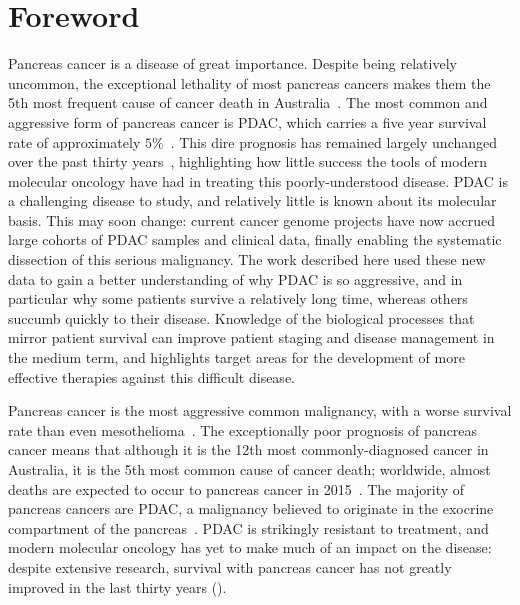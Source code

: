 \documentclass[thesis.tex]{subfiles}
\begin{document}
\chapter[Foreword]{Foreword}
\label{chap:intro}

Pancreas cancer is a disease of great importance.  Despite being relatively uncommon, the exceptional lethality of most pancreas cancers makes them the 5th most frequent cause of cancer death in Australia~\cite{CAN88}.  The most common and aggressive form of pancreas cancer is \gls{PDAC}, which carries a five year survival rate of approximately $5\%$~\cite{CAN65}.  This dire prognosis has remained largely unchanged over the past thirty years~\cite{CAN65, SEER2014}, highlighting how little success the tools of modern molecular oncology have had in treating this poorly-understood disease.  \gls{PDAC} is a challenging disease to study, and relatively little is known about its molecular basis.  This may soon change: current cancer genome projects have now accrued large cohorts of \gls{PDAC} samples and clinical data, finally enabling the systematic dissection of this serious malignancy.  The work described here used these new data to gain a better understanding of why \gls{PDAC} is so aggressive, and in particular why some patients survive a relatively long time, whereas others succumb quickly to their disease.  Knowledge of the biological processes that mirror patient survival can improve patient staging and disease management in the medium term, and highlights target areas for the development of more effective therapies against this difficult disease.

Pancreas cancer is the most aggressive common malignancy, with a worse survival rate than even mesothelioma~\cite{CAN65}.  The exceptionally poor prognosis of pancreas cancer means that although it is the 12th most commonly-diagnosed cancer in Australia, it is the 5th most common cause of cancer death; worldwide, almost  deaths are expected to occur to pancreas cancer in 2015~\cite{GLOBOCAN2015}.
The majority of pancreas cancers are \gls{PDAC}, a malignancy believed to originate in the exocrine compartment of the pancreas~\cite{Ryan2014}.  \gls{PDAC} is strikingly resistant to treatment, and modern molecular oncology has yet to make much of an impact on the disease: despite extensive research, survival with pancreas cancer has not greatly improved in the last thirty years ().
\end{document}
